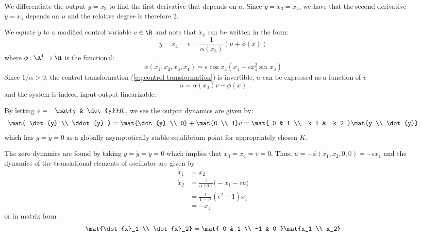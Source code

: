 \documentclass{homework}
\begin{document}
\begin{letterenum}
\item We differentiate the output $y = x_3$ to find the first derivative that depends
on $u$. Since $\dot{y} = \dot{x}_3 = x_4$, we have that the second
derivative $\ddot{y} = \dot{x}_4$ depends on $u$ and the relative degree is therefore
2.

\item We equate $\ddot{y}$ to a modified control variable $v\in\R$ and note that
$\dot{x}_4$ can be written in the form:
\begin{equation}
    \ddot{y} = \dot{x}_4 = v = \frac{1}{\alpha(x_3)} ( u + \phi(x))
    \label{eq:control-transformation}
\end{equation}
where $\phi: \R^4 \to \R$ is the functional:
\begin{equation*}
    \phi(x_1, x_2, x_3, x_4) = \epsilon \cos x_3 ( x_1 - \epsilon x_4^2 \sin x_3) 
\end{equation*}
Since $1 / \alpha > 0$, the control transformation (\ref{eq:control-transformation})
is invertible, $u$ can be expressed as a function of $v$
\begin{equation*}
    u = \alpha(x_3) v - \phi(x)
\end{equation*}
and the system is indeed input-output linearizable.

By letting $v = -\mat{y & \dot{y}} K$, we see the output dynamics are given by:
\begin{equation*}
    \mat{ \dot{y} \\ \ddot{y} } = \mat{\dot{y} \\ 0} + \mat{0 \\ 1} v =
        \mat{
        0 & 1 \\
        -k_1 & -k_2
    } \mat{y \\ \dot{y}}
\end{equation*}
which has $y=\dot{y} = 0$ as a globally asymptotically stable equilibrium point 
for appropriately chosen $K$.

\item The zero dynamics are found by taking $y = \dot{y} = \ddot{y} = 0$ which
implies that $x_3 = x_4 = v = 0$. Thus, $u = - \phi(x_1, x_2, 0, 0) = -\epsilon x_1$ and the dynamics
of the translational elements of oscillator are given by
\begin{align*}
    \dot{x}_1 &= x_2 \\
    \dot{x}_2 &= \frac{1}{\alpha(0)} \biggl(
        -x_1 - \epsilon u
    \biggr) \\
    &= \frac{1}{1 - \epsilon^2} (\epsilon^2 - 1) x_1 \\
    &= -x_1
\end{align*}
or in matrix form
\begin{equation*}
    \mat{\dot{x}_1 \\ \dot{x}_2} = \mat{
        0 & 1 \\
        -1 & 0
    } \mat{x_1 \\ x_2}
\end{equation*}


\end{letterenum}
\end{document}
